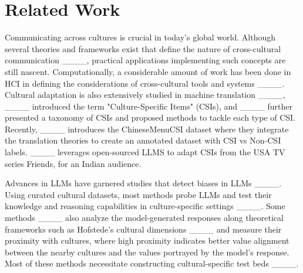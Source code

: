 \section{Related Work}
Communicating across cultures is crucial in today's global world. Although several theories and frameworks exist that define the nature of cross-cultural communication ____, practical applications implementing such concepts are still nascent. Computationally, a considerable amount of work has been done in HCI in defining the considerations of cross-cultural tools and systems ____. Cultural adaptation is also extensively studied in machine translation ____, ____ introduced the term "Culture-Specific Items" (CSIs), and ____ further presented a taxonomy of CSIs and proposed methods to tackle each type of CSI. Recently, ____ introduces the ChineseMenuCSI dataset where they integrate the translation theories to create an annotated dataset with CSI vs Non-CSI labels. ____ leverages open-sourced LLMS to adapt CSIs from the USA TV series Friends, for an Indian audience. 

Advances in LLMs have garnered studies that detect biases in LLMs ____. Using curated cultural datasets, most methods probe LLMs and test their knowledge and reasoning capabilities in culture-specific settings  ____. Some methods ____ also analyze the model-generated responses along theoretical frameworks such as Hofstede's cultural dimensions ____ and measure their proximity with cultures, where high proximity indicates better value alignment between the nearby cultures and the values portrayed by the model's response. Most of these methods necessitate constructing cultural-specific test beds ____.